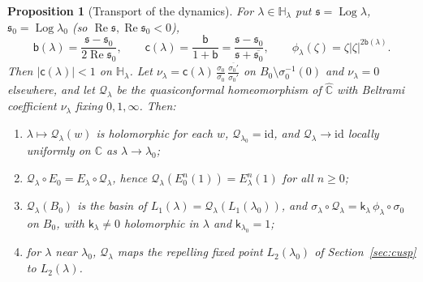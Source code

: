 \documentclass[11pt]{amsart}
\newtheorem{proposition}[theorem]{Proposition}
\theoremstyle{definition}
\begin{document}
\begin{proposition}[Transport of the dynamics]\label{prop:global-transport}
For $\lambda\in\mathbb H_\lambda$ put $\mathfrak s=\operatorname{Log}\lambda$, $\mathfrak s_0=\operatorname{Log}\lambda_0$ (so $\operatorname{Re}\mathfrak s,\operatorname{Re}\mathfrak s_0<0$),
\[
 \mathsf b(\lambda)=\frac{\mathfrak s-\mathfrak s_0}{2\operatorname{Re}\mathfrak s_0},\qquad
 \mathsf c(\lambda)=\frac{\mathsf b}{1+\mathsf b}=\frac{\mathfrak s-\mathfrak s_0}{\mathfrak s+\overline{\mathfrak s_0}},\qquad
 \phi_\lambda(\zeta)=\zeta|\zeta|^{2\mathsf b(\lambda)} .
\]
Then $|\mathsf c(\lambda)|<1$ on $\mathbb H_\lambda$.  Let $\nu_\lambda=\mathsf c(\lambda)\,\frac{\sigma_0}{\overline{\sigma_0}}\,\frac{\overline{\sigma_0'}}{\sigma_0'}$ on
$B_0\setminus\sigma_0^{-1}(0)$ and $\nu_\lambda=0$ elsewhere, and let $\mathcal Q_\lambda$ be the
quasiconformal homeomorphism of $\hat{\mathbb C}$ with Beltrami coefficient $\nu_\lambda$
fixing $0,1,\infty$.  Then:
\begin{enumerate}
\item $\lambda\mapsto \mathcal Q_\lambda(w)$ is holomorphic for each $w$, $\mathcal Q_{\lambda_0}=\mathrm{id}$, and
  $\mathcal Q_\lambda\to\mathrm{id}$ locally uniformly on $\mathbb C$ as $\lambda\to\lambda_0$;
\item $\mathcal Q_\lambda\circ E_0=E_\lambda\circ \mathcal Q_\lambda$, hence $\mathcal Q_\lambda(E_0^n(1))=E_\lambda^n(1)$ for all $n\ge0$;
\item $\mathcal Q_\lambda(B_0)$ is the basin of $L_1(\lambda)=\mathcal Q_\lambda(L_1(\lambda_0))$, and
  $\sigma_\lambda\circ \mathcal Q_\lambda=\mathsf k_\lambda\,\phi_\lambda\circ\sigma_0$ on $B_0$, with $\mathsf k_\lambda\ne0$ holomorphic in $\lambda$ and $\mathsf k_{\lambda_0}=1$;
\item for $\lambda$ near $\lambda_0$, $\mathcal Q_\lambda$ maps the repelling fixed point $L_2(\lambda_0)$ of
  Section~\ref{sec:cusp} to $L_2(\lambda)$.
\end{enumerate}
\end{proposition}
\end{document}
